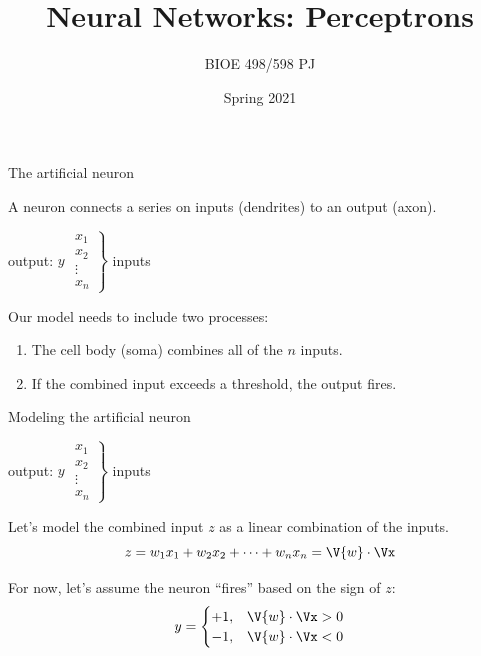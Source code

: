 \documentclass[9pt]{beamer}
\title{Neural Networks: Perceptrons}
\author{BIOE 498/598 PJ}
\date{Spring 2021}
\begin{document}
\maketitle

\begin{frame}{The artificial neuron}

A neuron connects a series on inputs (dendrites) to an output (axon).

\begin{center}
	output: $y$
	$\left. \begin{matrix}x_1\\x_2\\ \vdots\\ x_n\end{matrix} \right\rbrace$ inputs
\end{center}
\pause
Our model needs to include two processes:
\begin{enumerate}
	\item The cell body (soma) combines all of the $n$ inputs.
	\item If the combined input exceeds a threshold, the output fires.
\end{enumerate}

\end{frame}

\begin{frame}{Modeling the artificial neuron}

\begin{center}
	output: $y$
	$\left. \begin{matrix}x_1\\x_2\\ \vdots\\ x_n\end{matrix} \right\rbrace$ inputs
\end{center}
\bigskip
Let's model the combined input $z$ as a linear combination of the inputs.
\[ z = w_1x_1 + w_2x_2 + \cdots + w_nx_n = \V{w}\cdot\Vx \]

\pause
\bigskip
For now, let's assume the neuron ``fires'' based on the sign of $z$:
\[ y = \begin{cases} +1, & \V{w}\cdot\Vx > 0 \\ -1, & \V{w}\cdot\Vx < 0 \end{cases} \]

\end{frame}
\end{document}
